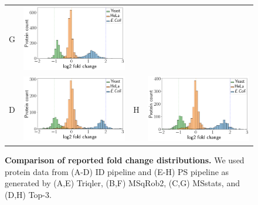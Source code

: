 \documentclass[11pt]{article}
\begin{document}
\begin{figure}[hbt]
\begin{tabular}{lclc}
        G & \includegraphics[width=0.4\linewidth]{../../result/report_plots_pipeline/histogram_PS_msstats.png} \\ 
        D & \includegraphics[width=0.4\linewidth]{../../result/report_plots_pipeline/histogram_ID_top3.png} &
        H & \includegraphics[width=0.4\linewidth]{../../result/report_plots_pipeline/histogram_PS_top3.png} 
    \end{tabular}
   
    \caption{{\bf Comparison of reported fold change distributions.} We used protein data from (A-D) ID pipeline and (E-H) PS pipeline as generated by 
    (A,E) Triqler, (B,F) MSqRob2, (C,G) MSstats, and (D,H) Top-3. \label{fig:fc_histogram_again}}
\end{figure}

\fi
\end{document}

